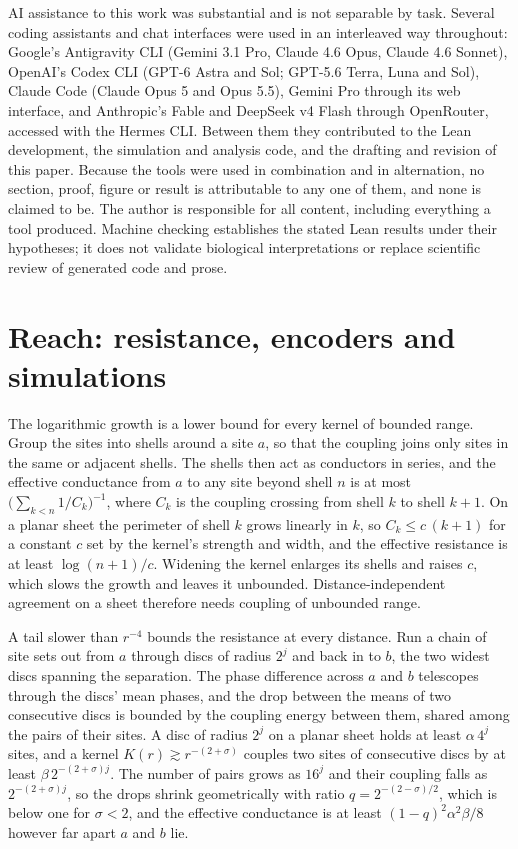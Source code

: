 \documentclass[12pt]{article}
\begin{document}
AI assistance to this work was substantial and is not separable by task.
Several coding assistants and chat interfaces were used in an interleaved way
throughout: Google's Antigravity CLI (Gemini 3.1 Pro, Claude 4.6 Opus, Claude
4.6 Sonnet), OpenAI's Codex CLI (GPT-6 Astra and Sol; GPT-5.6 Terra, Luna and
Sol), Claude Code (Claude Opus 5 and Opus 5.5), Gemini Pro through its web
interface, and Anthropic's Fable and DeepSeek v4 Flash through OpenRouter,
accessed with the Hermes CLI. Between them they contributed to the Lean
development, the simulation and analysis code, and the drafting and revision of
this paper. Because the tools were used in combination and in alternation, no
section, proof, figure or result is attributable to any one of them, and none is
claimed to be. The author is responsible for all content, including everything
a tool produced. Machine checking establishes the stated Lean results under
their hypotheses; it does not validate biological interpretations or replace
scientific review of generated code and prose.



\appendix

\section{Reach: resistance, encoders and simulations}
\label{app:reach}

The logarithmic growth is a lower bound for every kernel of bounded range. Group
the sites into shells around a site $a$, so that the coupling joins only sites
in the same or adjacent shells. The shells then act as conductors in series,
and the effective conductance from $a$ to any site beyond shell $n$ is at most
$\bigl(\sum_{k<n} 1/C_k\bigr)^{-1}$, where $C_k$ is the coupling crossing from
shell $k$ to shell $k+1$. On a planar sheet
the perimeter of shell $k$ grows linearly in $k$, so $C_k \le c\,(k+1)$ for a
constant $c$ set by the kernel's strength and width, and the effective
resistance is at least $\log(n+1)/c$.
Widening the kernel enlarges its shells and raises $c$, which slows the growth
and leaves it unbounded. Distance-independent agreement on a sheet therefore
needs coupling of unbounded range.

A tail slower than $r^{-4}$ bounds the resistance at every distance. Run a chain
of site sets out from $a$ through discs of radius $2^j$ and back in to $b$, the
two widest discs spanning the separation. The phase difference across $a$ and
$b$ telescopes through the discs' mean phases, and the drop between the means of
two consecutive discs is bounded by the coupling energy between them, shared
among the pairs of their sites. A disc of radius $2^j$ on a planar sheet holds at
least $\alpha\,4^j$ sites, and a kernel $K(r)\gtrsim r^{-(2+\sigma)}$ couples
two sites of consecutive discs by at least $\beta\,2^{-(2+\sigma)j}$. The
number of pairs grows as $16^j$ and their coupling falls as $2^{-(2+\sigma)j}$,
so the drops shrink geometrically with ratio $q=2^{-(2-\sigma)/2}$, which is
below one for $\sigma<2$, and the effective conductance is at least
$(1-q)^2\alpha^2\beta/8$ however far apart $a$ and $b$ lie.
\end{document}

